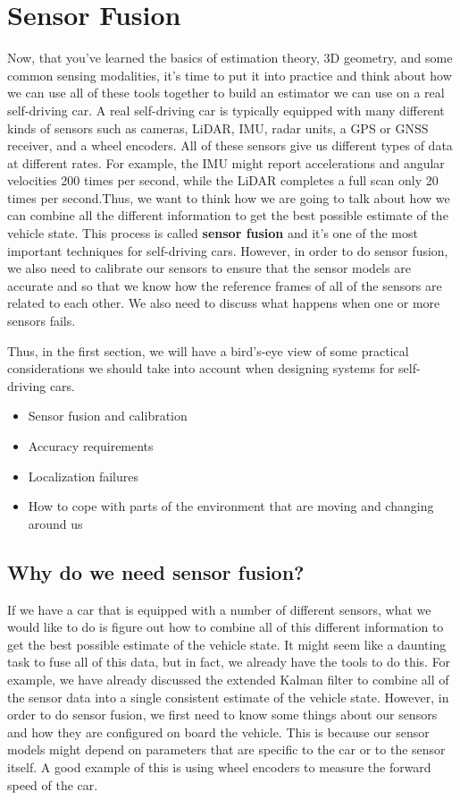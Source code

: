 \section{Sensor Fusion}
\label{sensor_fusion}

Now, that you've learned the basics of estimation theory, 3D geometry, and some common sensing modalities, it's time to put it into practice and think about how we can use all of these tools together to build an estimator we can use on a real self-driving car. A real self-driving car is typically equipped with many different kinds of sensors such as cameras, LiDAR, IMU, radar units, a GPS or GNSS receiver, and a wheel encoders. All of these sensors give us different types of data at different rates. For example, the IMU might report accelerations and angular velocities 200 times per second, while the LiDAR completes a full scan only 20 times per second.Thus, we want to think how we are going to talk about how we can combine all the different information to get the best possible estimate of the vehicle state. 
This process is called \textbf{sensor fusion} and it's one of the most important techniques for self-driving cars. However, in order to do sensor fusion, we also need to calibrate our sensors to ensure that the sensor models are accurate and so that we know how the reference frames of all of the sensors are related to each other. We also need to discuss what happens when one or more sensors fails. 

Thus, in the first section, we will have a bird's-eye view of some practical considerations we should take into account when designing systems for self-driving cars. 

\begin{itemize}
\item Sensor fusion and calibration
\item Accuracy requirements
\item Localization failures 
\item How to cope with parts of the environment that are moving and changing around us
\end{itemize}


\subsection{Why do we need sensor fusion?}
\label{why_do_we_need_sensor_fusion}

 If we have a car that is equipped with a number of different sensors, what we would like to do is figure out how to combine all of this different information to get the best possible estimate of the vehicle state. It might seem like a daunting task to fuse all of this data, but in fact, we already have the tools to do this. For example, we have already discussed the extended Kalman filter to combine all of the sensor data into a single consistent estimate of the vehicle state. However, in order to do sensor fusion, we first need to know some things about our sensors and how they are configured on board the vehicle. This is because our sensor models might depend on parameters that are specific to the car or to the sensor itself. A good example of this is using wheel encoders to measure the forward speed of the car. 

